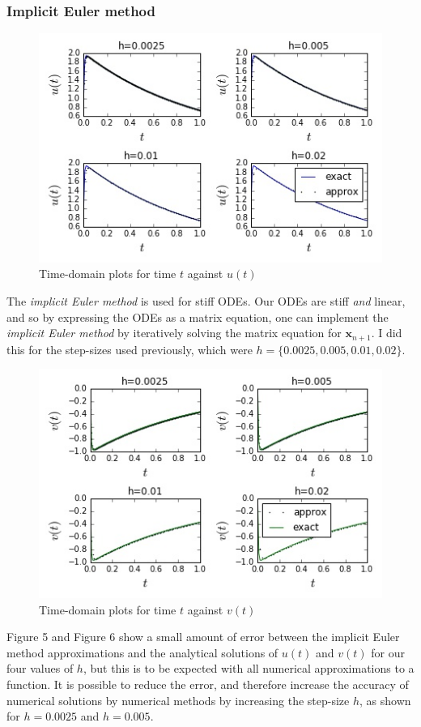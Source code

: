 \documentclass[11pt,a4paper]{article}
\begin{document}
\subsubsection*{Implicit Euler method}
\begin{figure}[h]
\caption{Time-domain plots for time $t$ against $u(t)$}
\includegraphics[scale=0.55]{back_euler_u.jpg}
\centering
\end{figure}
The \textit{implicit Euler method} is used for stiff ODEs. Our ODEs are stiff \textit{and} linear, and so by expressing the ODEs as a matrix equation, one can implement the \textit{implicit Euler method} by iteratively solving the matrix equation for $\boldsymbol{x}_{n+1}$. I did this for the step-sizes used previously, which were $h=\{0.0025,0.005,0.01,0.02\}$.
\begin{figure}[h]
\caption{Time-domain plots for time $t$ against $v(t)$}
\includegraphics[scale=0.55]{back_euler_v.jpg}
\centering
\end{figure}
Figure 5 and Figure 6 show a small amount of error between the implicit Euler method approximations and the analytical solutions of $u(t)$ and $v(t)$ for our four values of $h$, but this is to be expected with all numerical approximations to a function. It is possible to reduce the error, and therefore increase the accuracy of numerical solutions by numerical methods by increasing the step-size $h$, as shown for $h=0.0025$ and $h=0.005$. 
\end{document}
